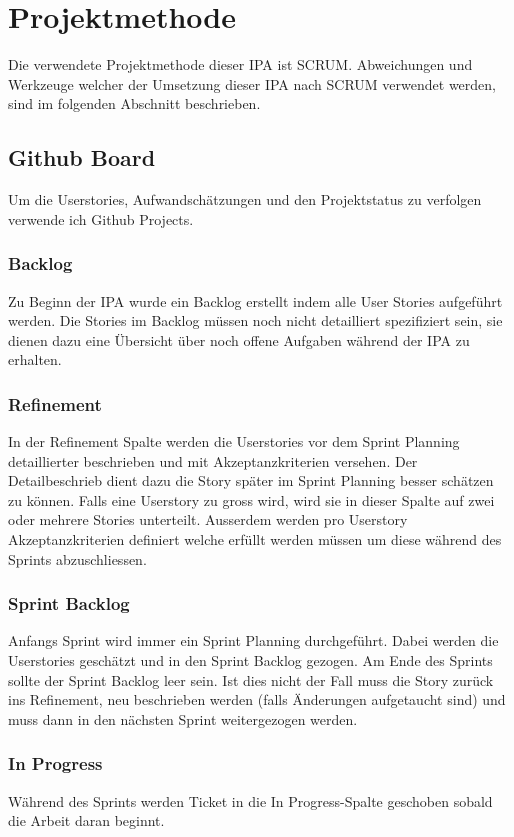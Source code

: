 \chapter{Projektmethode}
Die verwendete Projektmethode dieser IPA ist SCRUM. Abweichungen und Werkzeuge welcher der Umsetzung
dieser IPA nach SCRUM verwendet werden, sind im folgenden Abschnitt beschrieben.

\section{Github Board}
Um die Userstories, Aufwandschätzungen und den Projektstatus zu verfolgen verwende ich Github Projects. 

\subsection{Backlog}
Zu Beginn der IPA wurde ein Backlog erstellt indem alle User Stories aufgeführt werden. Die Stories im Backlog
müssen noch nicht detailliert spezifiziert sein, sie dienen dazu eine Übersicht über noch offene Aufgaben während
der IPA zu erhalten.

\subsection{Refinement}
In der Refinement Spalte werden die Userstories vor dem Sprint Planning detaillierter beschrieben und mit Akzeptanzkriterien versehen. 
Der Detailbeschrieb dient dazu die Story später im Sprint Planning besser schätzen zu können.
Falls eine Userstory zu gross wird, wird sie in dieser Spalte auf zwei oder mehrere Stories unterteilt. Ausserdem werden pro Userstory Akzeptanzkriterien
definiert welche erfüllt werden müssen um diese während des Sprints abzuschliessen.

\newpage

\subsection{Sprint Backlog}
Anfangs Sprint wird immer ein Sprint Planning durchgeführt. Dabei werden die Userstories geschätzt und in den Sprint Backlog gezogen. 
Am Ende des Sprints sollte der Sprint Backlog leer sein. Ist dies nicht der Fall muss die Story zurück ins Refinement, neu beschrieben werden 
(falls Änderungen aufgetaucht sind) und muss dann in den nächsten Sprint weitergezogen werden.

\subsection{In Progress}
Während des Sprints werden Ticket in die In Progress-Spalte geschoben sobald die Arbeit daran beginnt.


